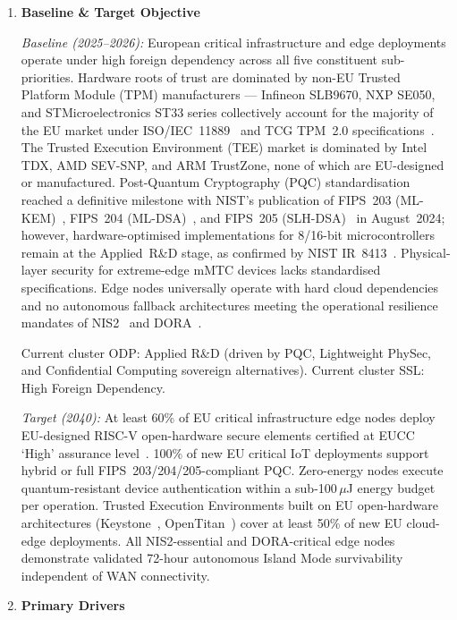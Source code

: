\begin{enumerate}

\item \textbf{Baseline \& Target Objective}

\textit{Baseline (2025--2026):}
European critical infrastructure and edge deployments operate under high foreign dependency
across all five constituent sub-priorities. Hardware roots of trust are dominated by non-EU
Trusted Platform Module (TPM) manufacturers --- Infineon SLB9670, NXP SE050, and
STMicroelectronics ST33 series collectively account for the majority of the EU market under
ISO/IEC~11889~\cite{isoiec11889} and TCG TPM~2.0 specifications~\cite{tgcpm20}. The Trusted
Execution Environment (TEE) market is dominated by Intel TDX, AMD SEV-SNP, and ARM TrustZone,
none of which are EU-designed or manufactured. Post-Quantum Cryptography (PQC) standardisation
reached a definitive milestone with NIST's publication of FIPS~203 (ML-KEM)~\cite{fips203},
FIPS~204 (ML-DSA)~\cite{fips204}, and FIPS~205 (SLH-DSA)~\cite{fips205} in August~2024;
however, hardware-optimised implementations for 8/16-bit microcontrollers remain at the
Applied~R\&D stage, as confirmed by NIST IR~8413~\cite{nistir8413}. Physical-layer security
for extreme-edge mMTC devices lacks standardised specifications. Edge nodes universally operate
with hard cloud dependencies and no autonomous fallback architectures meeting the operational
resilience mandates of NIS2~\cite{nis2} and DORA~\cite{dora}.

Current cluster ODP: Applied R\&D (driven by PQC, Lightweight PhySec, and Confidential
Computing sovereign alternatives). Current cluster SSL: High Foreign Dependency.

\textit{Target (2040):}
At least 60\% of EU critical infrastructure edge nodes deploy EU-designed RISC-V open-hardware
secure elements certified at EUCC `High' assurance level~\cite{eucc}. 100\% of new EU critical
IoT deployments support hybrid or full FIPS~203/204/205-compliant PQC. Zero-energy nodes
execute quantum-resistant device authentication within a sub-100\,$\mu$J energy budget per
operation. Trusted Execution Environments built on EU open-hardware architectures (Keystone~\cite{keystone},
OpenTitan~\cite{opentitan}) cover at least 50\% of new EU cloud-edge deployments. All NIS2-essential
and DORA-critical edge nodes demonstrate validated 72-hour autonomous Island Mode survivability
independent of WAN connectivity.

\item \textbf{Primary Drivers}


\end{enumerate}
